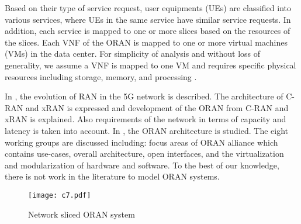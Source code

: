 \documentclass[conference]{IEEEtran}
\begin{document}
Based on their type of service request, user equipments (UEs) are classified into various services, where UEs in the same service have similar service requests. In addition, each service is mapped to one or more slices based on the resources of the slices. Each VNF of the ORAN is mapped to one or more virtual machines (VMs) in the data center. For simplicity of analysis and without loss of generality, we assume a VNF is mapped to one VM and requires specific physical resources including storage, memory, and processing \cite{frdl,luong2018novel,luong2018novel1}.


In \cite{oranT},  the evolution of RAN in the  5G network is described. The architecture of C-RAN and xRAN is expressed and development of the ORAN from C-RAN and xRAN is explained. Also requirements of the network in terms of capacity and latency is taken into account.
In \cite{oran12},  the ORAN architecture is studied. The eight working groups are discussed including: focus areas of ORAN alliance which contains use-cases, overall architecture,  open interfaces, and  the virtualization and modularization of hardware and software. To the best of our knowledge, there is not work in the literature to model ORAN systems. 


\begin{figure}
  \centering
    \texttt{[image: c7.pdf]}
  \caption{Network sliced ORAN system}
  \label{fig:c11}
\end{figure}
\end{document}
